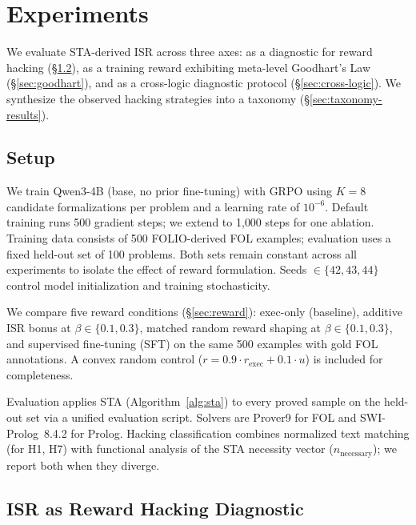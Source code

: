 \section{Experiments}
\label{sec:experiments}

We evaluate STA-derived ISR across three axes: as a diagnostic for reward hacking (\S\ref{sec:diagnostic}), as a training reward exhibiting meta-level Goodhart's Law (\S\ref{sec:goodhart}), and as a cross-logic diagnostic protocol (\S\ref{sec:cross-logic}).
We synthesize the observed hacking strategies into a taxonomy (\S\ref{sec:taxonomy-results}).

\subsection{Setup}
\label{sec:setup}

We train Qwen3-4B (base, no prior fine-tuning) with GRPO \cite{deepseekmath} using $K{=}8$ candidate formalizations per problem and a learning rate of $10^{-6}$.
Default training runs 500 gradient steps; we extend to 1{,}000 steps for one ablation.
Training data consists of 500 FOLIO-derived \cite{folio} FOL examples; evaluation uses a fixed held-out set of 100 problems.
Both sets remain constant across all experiments to isolate the effect of reward formulation.
Seeds $\in \{42, 43, 44\}$ control model initialization and training stochasticity.

We compare five reward conditions (\S\ref{sec:reward}): exec-only (baseline), additive ISR bonus at $\beta \in \{0.1, 0.3\}$, matched random reward shaping at $\beta \in \{0.1, 0.3\}$, and supervised fine-tuning (SFT) on the same 500 examples with gold FOL annotations.
A convex random control ($r = 0.9 \cdot r_{\text{exec}} + 0.1 \cdot u$) is included for completeness.

Evaluation applies STA (Algorithm~\ref{alg:sta}) to every proved sample on the held-out set via a unified evaluation script.
Solvers are Prover9 \cite{mccune2010prover9} for FOL and SWI-Prolog~8.4.2 for Prolog.
Hacking classification combines normalized text matching (for H1, H7) with functional analysis of the STA necessity vector ($n_{\text{necessary}}$); we report both when they diverge.

\subsection{ISR as Reward Hacking Diagnostic}
\label{sec:diagnostic}

